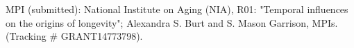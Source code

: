 \item MPI (submitted): National Institute on Aging (NIA), R01: "Temporal influences on the origins of longevity"; Alexandra S. Burt and S. Mason Garrison, MPIs. (Tracking \# GRANT14773798).






%
%
